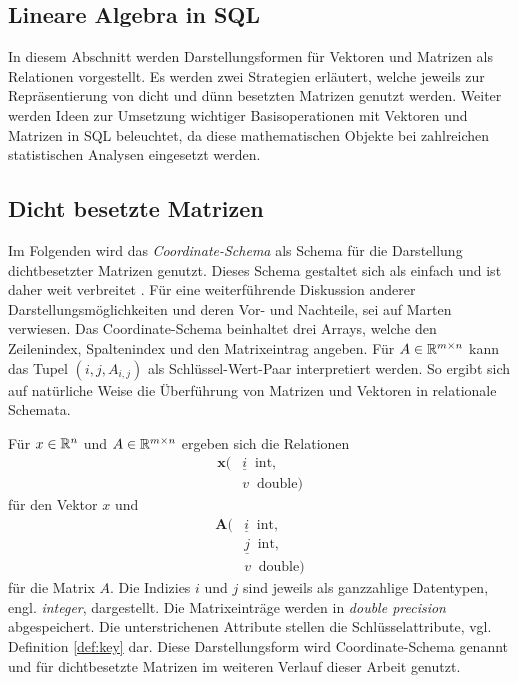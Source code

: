 \subsection{Lineare Algebra in SQL}
\label{abs:SQL_linalg}
In diesem Abschnitt werden Darstellungsformen für Vektoren und Matrizen als Relationen vorgestellt. Es werden zwei Strategien erläutert, welche jeweils zur Repräsentierung von dicht und dünn besetzten Matrizen genutzt werden. Weiter werden Ideen zur Umsetzung wichtiger Basisoperationen mit Vektoren und Matrizen in SQL beleuchtet, da diese mathematischen Objekte bei zahlreichen statistischen Analysen eingesetzt werden.
\subsection*{Dicht besetzte Matrizen}
Im Folgenden wird das \textit{Coordinate-Schema}\cite{martendiss} als Schema für die Darstellung dichtbesetzter Matrizen genutzt. Dieses Schema gestaltet sich als einfach und ist daher weit verbreitet \cite{saad1990sparskit}.
Für eine weiterführende Diskussion anderer Darstellungsmöglichkeiten und deren Vor- und Nachteile, sei auf Marten\cite{martendiss} verwiesen. 
Das Coordinate-Schema beinhaltet drei Arrays, welche den Zeilenindex, Spaltenindex und den Matrixeintrag angeben. Für $A \in \mathbb{R}^{m \times n}$ kann das Tupel $(i,j,A_{i,j})$ als Schlüssel-Wert-Paar interpretiert werden. So ergibt sich auf natürliche Weise die Überführung von Matrizen und Vektoren in relationale Schemata.
\begin{defi}
    \label{def:coordinate_sheme}
    Für $x \in \mathbb{R}^n$ und $A \in \mathbb{R}^{m \times n}$ ergeben sich die Relationen
    \begin{align*}
        \mathbf{x}( &\underline{i} \; \; \mathrm{int}, \\
        &v \; \; \mathrm{double})
    \end{align*}
    für den Vektor $x$ und
    \begin{align*}
        \mathbf{A}( &\underline{i} \; \; \mathrm{int}, \\
        &\underline{j} \; \;\mathrm{int},\\
        &v \; \; \mathrm{double})
    \end{align*} für die Matrix $A$. Die Indizies $i$ und $j$ sind jeweils als ganzzahlige Datentypen, engl. \textit{integer}, dargestellt. Die Matrixeinträge werden in \textit{double precision}\cite{30711} abgespeichert. Die unterstrichenen Attribute stellen die Schlüsselattribute, vgl. Definition \ref{def:key} dar. Diese Darstellungsform wird Coordinate-Schema genannt und für dichtbesetzte Matrizen im weiteren Verlauf dieser Arbeit genutzt.
\end{defi}

